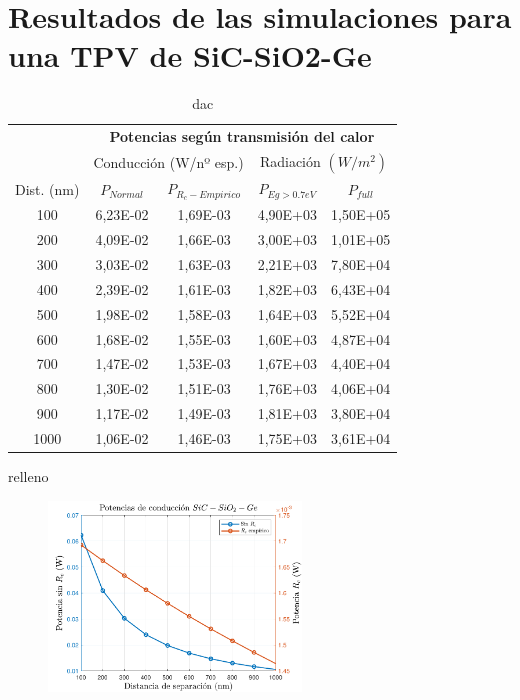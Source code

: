 \section{Resultados de las simulaciones para una TPV de SiC-SiO2-Ge}
\begin{table}[h]
	\centering
		\begin{tabular}{|c||c|c||c|c|}
		\hline
\multirow{2}{*}{ }& \multicolumn{4}{c|}{\textbf{\large Potencias según transmisión del calor}}\\ \cline{2-5}
& \multicolumn{2}{c||}{Conducción (W/nº esp.)}& \multicolumn{2}{c|}{Radiación $(W/m^2)$}\\ \hline
Dist. (nm)&$P_{Normal}$&$P_{R_c-Empirico}$&$P_{Eg>0.7eV}$&$P_{full}$\\ \hline \hline
100&6,23E-02&1,69E-03&4,90E+03&1,50E+05\\ \hline 
200&4,09E-02&1,66E-03&3,00E+03&1,01E+05\\ \hline 
300&3,03E-02&1,63E-03&2,21E+03&7,80E+04\\ \hline 
400&2,39E-02&1,61E-03&1,82E+03&6,43E+04\\ \hline 
500&1,98E-02&1,58E-03&1,64E+03&5,52E+04\\ \hline 
600&1,68E-02&1,55E-03&1,60E+03&4,87E+04\\ \hline 
700&1,47E-02&1,53E-03&1,67E+03&4,40E+04\\ \hline 
800&1,30E-02&1,51E-03&1,76E+03&4,06E+04\\ \hline 
900&1,17E-02&1,49E-03&1,81E+03&3,80E+04\\ \hline 
1000&1,06E-02&1,46E-03&1,75E+03&3,61E+04\\ \hline 
		\end{tabular}
	\caption{dac}
	\label{tab:dac}
\end{table}

relleno
\begin{figure}[H]
	\centering
		\includegraphics[width=0.6\textwidth]{figuras/Resultados/conduccion/pdf/Prc_SiCSiO2Ge.pdf}
	\caption{ }
	\label{fig:Prc_SiCSiO2Ge}
\end{figure}

